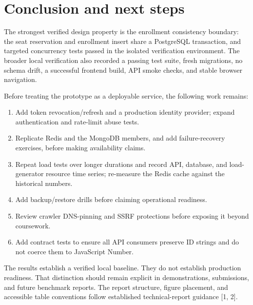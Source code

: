 \documentclass[11pt,a4paper,oneside]{report}
\begin{document}
\chapter{Conclusion and next steps}
The strongest verified design property is the enrollment consistency boundary: the seat reservation and enrollment insert share a PostgreSQL transaction, and targeted concurrency tests passed in the isolated verification environment. The broader local verification also recorded a passing test suite, fresh migrations, no schema drift, a successful frontend build, API smoke checks, and stable browser navigation.

Before treating the prototype as a deployable service, the following work remains:
\begin{enumerate}
\item Add token revocation/refresh and a production identity provider; expand authentication and rate-limit abuse tests.
\item Replicate Redis and the MongoDB members, and add failure-recovery exercises, before making availability claims.
\item Repeat load tests over longer durations and record API, database, and load-generator resource time series; re-measure the Redis cache against the historical numbers.
\item Add backup/restore drills before claiming operational readiness.
\item Review crawler DNS-pinning and SSRF protections before exposing it beyond coursework.
\item Add contract tests to ensure all API consumers preserve ID strings and do not coerce them to JavaScript Number.
\end{enumerate}

The results establish a verified local baseline. They do not establish production readiness. That distinction should remain explicit in demonstrations, submissions, and future benchmark reports. The report structure, figure placement, and accessible table conventions follow established technical-report guidance [1, 2].
\end{document}
